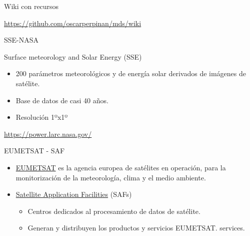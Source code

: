 \documentclass[aspectratio=169, usenames,svgnames,dvipsnames]{beamer}
\begin{document}
\begin{frame}[label={sec:org7217e8f}]{Wiki con recursos}
\begin{block}{}
\url{https://github.com/oscarperpinan/mds/wiki}
\end{block}
\end{frame}


\begin{frame}[label={sec:org0d661e5}]{SSE-NASA}
\begin{block}{Surface meteorology and Solar Energy (SSE)}
\begin{itemize}
\item 200 parámetros meteorológicos y de energía solar derivados de imágenes de satélite.
\item Base de datos de casi 40 años.
\item Resolución 1ºx1º
\end{itemize}

\url{https://power.larc.nasa.gov/}
\end{block}
\end{frame}

\begin{frame}[label={sec:org8a1d4fc}]{EUMETSAT - SAF}
\begin{itemize}
\item \alert{\href{http://www.eumetsat.int}{EUMETSAT}} es la agencia europea de satélites en operación, para la monitorización de la meteorología, clima y el medio ambiente.
\item \alert{\href{https://www.eumetsat.int/about-us/satellite-application-facilities-safs}{Satellite Application Facilities} (SAFs)}
\begin{itemize}
\item Centros dedicados al procesamiento de datos de satélite.
\item Generan y distribuyen los productos y servicios EUMETSAT.
services.
\end{itemize}
\end{itemize}
\end{frame}
\end{document}
